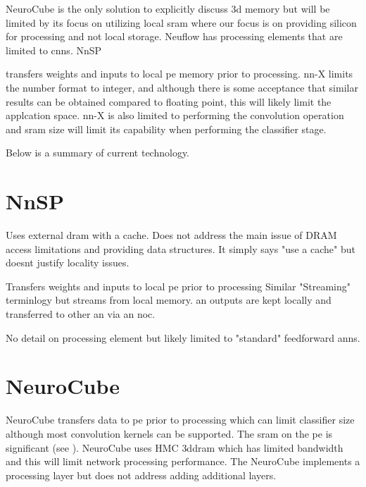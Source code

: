 {{%
\iffalse

NeuroCube\cite{kim2016neurocube} is the only solution to explicitly discuss \ac{3d} memory but will be limited by its focus on utilizing local \ac{sram} where our focus is on
providing silicon for processing and not local storage.
Neuflow\cite{farabet2011neuflow} has processing elements that are limited to \acp{cnn}.
NnSP{\cite{esmaeilzadeh2005nnsp} transfers weights and inputs to local \ac{pe} memory prior to processing.
nn-X\cite{gokhale2014240} limits the number format to integer, and although there is some acceptance that similar
results can be obtained compared to floating point, this will likely limit the applcation space. 
nn-X is also limited to performing the convolution operation and \ac{sram} size will limit its capability when performing the classifier stage.

Below is a summary of current technology.

\section[NnSP]{NnSP{\cite{esmaeilzadeh2005nnsp}}}

Uses external \ac{dram} with a cache.
Does not address the main issue of DRAM access limitations and providing data structures.
It simply says "use a cache" but doesnt justify locality issues.

Transfers weights and inputs to local \ac{pe} prior to processing
Similar "Streaming" terminlogy but streams from local memory.
\ac{an} outputs are kept locally and transferred to other \ac{an} via an  \ac{noc}.

No detail on processing element but likely limited to "standard" feedforward \acp{ann}.


\section[NeuroCube]{NeuroCube{\cite{kim2016neurocube}}}
NeuroCube\cite{kim2016neurocube} transfers data to \ac{pe} prior to processing which can limit classifier size although most
convolution kernels can be supported.
The \ac{sram} on the \ac{pe} is significant (see ).
NeuroCube uses HMC \ac{3ddram} which has limited bandwidth and this will limit network processing performance.
The NeuroCube implements a processing layer but does not address adding additional layers. 

}}}
